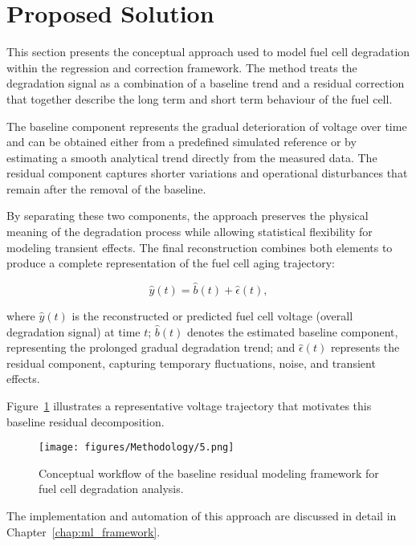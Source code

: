 \section{Proposed Solution}

This section presents the conceptual approach used to model fuel cell degradation within the regression and correction framework. The method treats the degradation signal as a combination of a baseline trend and a residual correction that together describe the long term and short term behaviour of the fuel cell.

The baseline component represents the gradual deterioration of voltage over time and can be obtained either from a predefined simulated reference or by estimating a smooth analytical trend directly from the measured data. The residual component captures shorter variations and operational disturbances that remain after the removal of the baseline.

By separating these two components, the approach preserves the physical meaning of the degradation process while allowing statistical flexibility for modeling transient effects. The final reconstruction combines both elements to produce a complete representation of the fuel cell aging trajectory:

\[
\hat{y}(t) = \hat{b}(t) + \hat{\epsilon}(t),
\]

\noindent where  
\(\hat{y}(t)\) is the reconstructed or predicted fuel cell voltage (overall degradation signal) at time \(t\);  
\(\hat{b}(t)\) denotes the estimated baseline component, representing the prolonged gradual degradation trend; and  
\(\hat{\epsilon}(t)\) represents the residual component, capturing temporary fluctuations, noise, and transient effects.

Figure~\ref{fig:baseline_residual_framework} illustrates a representative voltage trajectory that motivates this baseline residual decomposition.

\begin{figure}[h!]
\centering
\texttt{[image: figures/Methodology/5.png]}
\caption{Conceptual workflow of the baseline residual modeling framework for fuel cell degradation analysis.}
\label{fig:baseline_residual_framework}
\end{figure}

The implementation and automation of this approach are discussed in detail in Chapter~\ref{chap:ml_framework}.

